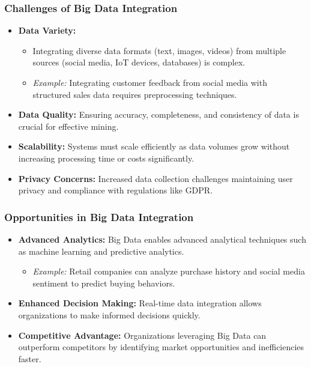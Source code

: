 \documentclass{beamer}
\begin{document}
\begin{frame}
    \frametitle{Challenges of Big Data Integration}

    \begin{itemize}
        \item \textbf{Data Variety:} 
            \begin{itemize}
                \item Integrating diverse data formats (text, images, videos) from multiple sources (social media, IoT devices, databases) is complex. 
                \item \textit{Example:} Integrating customer feedback from social media with structured sales data requires preprocessing techniques.
            \end{itemize}
        
        \item \textbf{Data Quality:} 
            Ensuring accuracy, completeness, and consistency of data is crucial for effective mining.
        
        \item \textbf{Scalability:} 
            Systems must scale efficiently as data volumes grow without increasing processing time or costs significantly.
        
        \item \textbf{Privacy Concerns:} 
            Increased data collection challenges maintaining user privacy and compliance with regulations like GDPR.
    \end{itemize}
\end{frame}

\begin{frame}
    \frametitle{Opportunities in Big Data Integration}

    \begin{itemize}
        \item \textbf{Advanced Analytics:} 
            Big Data enables advanced analytical techniques such as machine learning and predictive analytics.
            \begin{itemize}
                \item \textit{Example:} Retail companies can analyze purchase history and social media sentiment to predict buying behaviors.
            \end{itemize} 
        
        \item \textbf{Enhanced Decision Making:} 
            Real-time data integration allows organizations to make informed decisions quickly.
        
        \item \textbf{Competitive Advantage:} 
            Organizations leveraging Big Data can outperform competitors by identifying market opportunities and inefficiencies faster.
    \end{itemize}
\end{frame}
\end{document}
